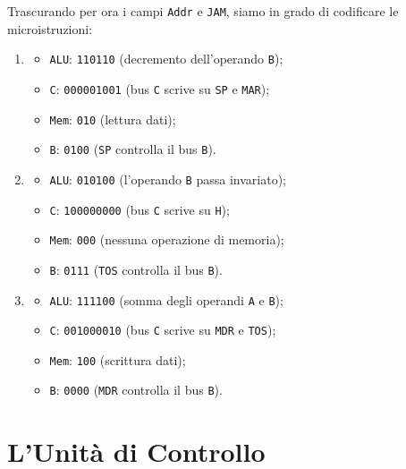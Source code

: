\documentclass[a4paper,12pt]{scrreprt}
\begin{document}
Trascurando per ora i campi \lstinline{Addr} e \lstinline{JAM}, siamo in grado
di codificare le microistruzioni:
\begin{enumerate}
  \item
  \begin{itemize}
    \item \lstinline{ALU}: \lstinline{110110} (decremento dell'operando \lstinline{B});
    \item \lstinline{C}: \lstinline{000001001} (bus \lstinline{C} scrive su
    \lstinline{SP} e \lstinline{MAR});
    \item \lstinline{Mem}: \lstinline{010} (lettura dati);
    \item \lstinline{B}: \lstinline{0100} (\lstinline{SP} controlla il bus \lstinline{B}).
  \end{itemize}
  \item
  \begin{itemize}
    \item \lstinline{ALU}: \lstinline{010100} (l'operando \lstinline{B} passa invariato);
    \item \lstinline{C}: \lstinline{100000000} (bus \lstinline{C} scrive su
    \lstinline{H});
    \item \lstinline{Mem}: \lstinline{000} (nessuna operazione di memoria);
    \item \lstinline{B}: \lstinline{0111} (\lstinline{TOS} controlla il bus \lstinline{B}).
  \end{itemize}
  \item
  \begin{itemize}
    \item \lstinline{ALU}: \lstinline{111100} (somma degli operandi
    \lstinline{A} e \lstinline{B});
    \item \lstinline{C}: \lstinline{001000010} (bus \lstinline{C} scrive su
    \lstinline{MDR} e \lstinline{TOS});
    \item \lstinline{Mem}: \lstinline{100} (scrittura dati);
    \item \lstinline{B}: \lstinline{0000} (\lstinline{MDR} controlla il bus \lstinline{B}).
  \end{itemize}
\end{enumerate}

\section{L'Unità di Controllo}
\end{document}
